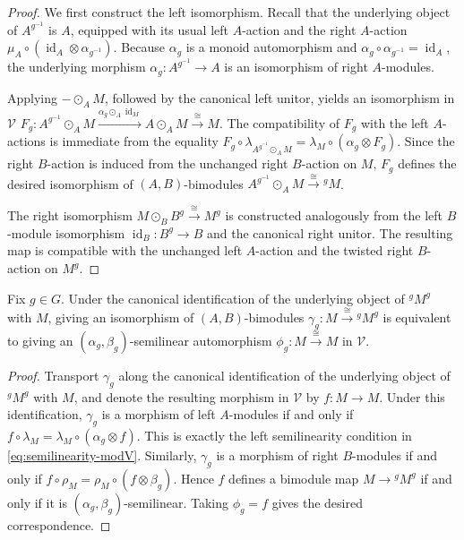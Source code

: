 \documentclass[11pt,oneside]{amsart}
\DeclareMathOperator{\id}{id}
\numberwithin{equation}{section}
\numberwithin{figure}{section}
\theoremstyle{plain}
\theoremstyle{definition}
\theoremstyle{remark}
\begin{document}
\begin{proof}
We first construct the left isomorphism. Recall that the underlying object of \(A^{g^{-1}}\) is \(A\), equipped with its usual left \(A\)-action and the right \(A\)-action \(\mu_A\circ(\id_A\otimes\alpha_{g^{-1}})\). Because \(\alpha_g\) is a monoid automorphism and \(\alpha_g\circ\alpha_{g^{-1}}=\id_A\), the underlying morphism \(\alpha_g\colon A^{g^{-1}}\to A\) is an isomorphism of right \(A\)-modules. 

Applying \(-\odot_AM\), followed by the canonical left unitor, yields an isomorphism in \(\mathcal V\)
\(
F_g: A^{g^{-1}}\odot_AM \xrightarrow{\alpha_g\odot_A\id_M} A\odot_AM \xrightarrow{\cong} M.
\)
The compatibility of \(F_g\) with the left \(A\)-actions is immediate from the equality \(F_g\circ\lambda_{A^{g^{-1}}\odot_AM} = \lambda_M\circ(\alpha_g\otimes F_g)\). Since the right \(B\)-action is induced   from the unchanged right \(B\)-action on \(M\), \(F_g\) defines the desired isomorphism of \((A,B)\)-bimodules \(A^{g^{-1}}\odot_AM\xrightarrow{\cong}{}^gM\).

The right isomorphism
\(M\odot_B B^g\xrightarrow{\cong}M^g\)
is constructed analogously from the left \(B\)-module isomorphism
\(\id_B\colon B^g\to B\) and the canonical right unitor. The resulting
map is compatible with the unchanged left \(A\)-action and the twisted
right \(B\)-action on \(M^g\).
\end{proof}


\begin{lemma}\label{lem:gamma-vs-semilinear}
Fix \(g\in G\). Under the canonical identification of the underlying
object of \({}^gM^g\) with \(M\), giving an isomorphism of
\((A,B)\)-bimodules
\(
\gamma_g\colon M\xrightarrow{\cong}{}^gM^g
\)
is equivalent to giving an
\((\alpha_g,\beta_g)\)-semilinear automorphism
\(
\phi_g\colon M\xrightarrow{\cong}M
\)
in \(\mathcal V\).
\end{lemma}


\begin{proof}
Transport \(\gamma_g\) along the canonical identification of the
underlying object of \({}^gM^g\) with \(M\), and denote the resulting
morphism in \(\mathcal V\) by \(f\colon M\to M\).
Under this identification, \(\gamma_g\) is a morphism of left
\(A\)-modules if and only if
\(
f\circ\lambda_M
=
\lambda_M\circ(\alpha_g\otimes f).
\)
This is exactly the left semilinearity condition in
\eqref{eq:semilinearity-modV}. Similarly, \(\gamma_g\) is a morphism of
right \(B\)-modules if and only if
\(
f\circ\rho_M
=
\rho_M\circ(f\otimes\beta_g).
\)
Hence \(f\) defines a bimodule map
\(M\to{}^gM^g\) if and only if it is
\((\alpha_g,\beta_g)\)-semilinear.
 Taking
\(\phi_g=f\) gives the desired correspondence.
\end{proof}
\end{document}
